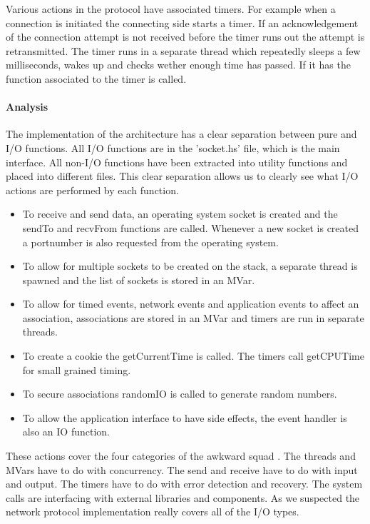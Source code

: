 Various actions in the protocol have associated timers. For example when a connection is initiated the connecting side starts a timer. If an acknowledgement of the connection attempt is not received before the timer runs out the attempt is retransmitted. The timer runs in a separate thread which repeatedly sleeps a few milliseconds, wakes up and checks wether enough time has passed. If it has the function associated to the timer is called.

\paragraph{Analysis}
The implementation of the architecture has a clear separation between pure and I/O functions. All I/O functions are in the 'socket.hs' file, which is the main interface. All non-I/O functions have been extracted into utility functions and placed into different files. This clear separation allows us to clearly see what I/O actions are performed by each function.

\begin{itemize}
\item To receive and send data, an operating system socket is created and the sendTo and recvFrom functions are called. Whenever a new socket is created a portnumber is also requested from the operating system.
\item To allow for multiple sockets to be created on the stack, a separate thread is spawned and the list of sockets is stored in an MVar.
\item To allow for timed events, network events and application events to affect an association, associations are stored in an MVar and timers are run in separate threads.
\item To create a cookie the getCurrentTime is called. The timers call getCPUTime for small grained timing.
\item To secure associations randomIO is called to generate random numbers.
\item To allow the application interface to have side effects, the event handler is also an IO function.
\end{itemize}

These actions cover the four categories of the awkward squad \cite{jones_tackling_2009}. The threads and MVars have to do with concurrency. The send and receive have to do with input and output. The timers have to do with error detection and recovery. The system calls are interfacing with external libraries and components. As we suspected the network protocol implementation really covers all of the I/O types.

